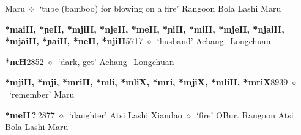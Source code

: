 \begin{list}{}{\leftmargin=1.5em \itemindent=-1.5em}
         Maru 
\hspace{1ex}
         $\diamond$~`tube (bamboo) for blowing on a fire'
         Rangoon 
\hspace{1ex}
         Bola 
\hspace{1ex}
         Lashi 
\hspace{1ex}
         Maru 
  \item {\footnotesize \textbf{*maiH, *ɲeH, *mjiH, *njeH, *meH, *ɲiH, *miH, *mjeH, *njaiH, *mjaiH, *ɲaiH, *neH, *njiH}}{\tiny 5717}
\hspace{1ex}
         $\diamond$~`husband'
         Achang\_Longchuan 
  \item {\footnotesize \textbf{*nɛH}}{\tiny 2852}
\hspace{1ex}
         $\diamond$~`dark, get'
         Achang\_Longchuan 
  \item {\footnotesize \textbf{*mjiH, *mji, *mriH, *mli, *mliX, *mri, *mjiX, *mliH, *mriX}}{\tiny 8939}
\hspace{1ex}
         $\diamond$~`remember'
         Maru 
  \item {\footnotesize \textbf{*meH\,?\,}}{\tiny 2877}
\hspace{1ex}
         $\diamond$~`daughter'
         Atsi 
\hspace{1ex}
         Lashi 
\hspace{1ex}
         Xiandao 
\hspace{1ex}
         $\diamond$~`fire'
         OBur. 
\hspace{1ex}
         Rangoon 
\hspace{1ex}
         Atsi 
\hspace{1ex}
         Bola 
\hspace{1ex}
         Lashi 
\hspace{1ex}
         Maru 

\end{list}
